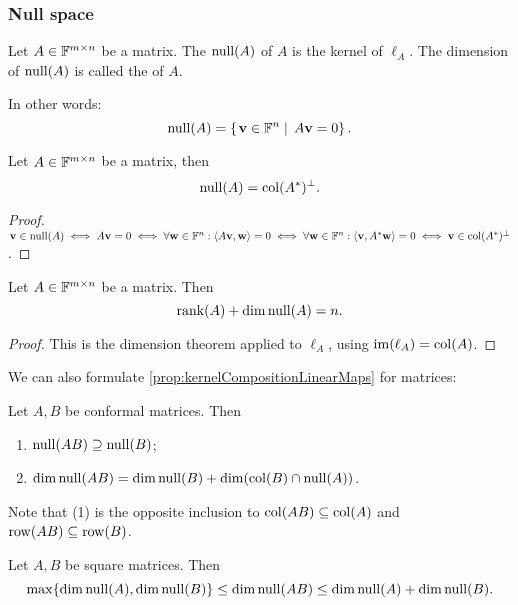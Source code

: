\subsubsection{Null space}
\begin{definition}
Let $A\in \mathbb{F}^{m\times n}$ be a matrix. The  $\operatorname{null}(A)$ of $A$ is the kernel of $\ell_A$. The dimension of $\operatorname{null}(A)$ is called the  of $A$.
\end{definition}
In other words:
\[ \operatorname{null}(A) = \left\{\left. \bm{\mathrm{v}}\in \mathbb{F}^n \;\right|\; A\bm{\mathrm{v}} = 0 \right\}. \]

\begin{proposition}
Let $A\in\mathbb{F}^{m\times n}$ be a matrix, then
\[ \operatorname{null}(A) = \operatorname{col}(A^*)^\perp. \]
\end{proposition}
\begin{proof}
$\bm{\mathrm{v}}\in\operatorname{null}(A) \iff A\bm{\mathrm{v}} = 0 \iff \forall \bm{\mathrm{w}}\in\mathbb{F}^n:\left\langle A\bm{\mathrm{v}},\bm{\mathrm{w}} \right\rangle=0 \iff \forall \bm{\mathrm{w}}\in\mathbb{F}^n: \left\langle \bm{\mathrm{v}},A^*\bm{\mathrm{w}} \right\rangle=0 \iff \bm{\mathrm{v}}\in\operatorname{col}(A^*)^\perp$.
\end{proof}

\begin{lemma} \label{lemma:dimensionTheoremMatrices}
Let $A\in \mathbb{F}^{m\times n}$ be a matrix. Then
\[ \operatorname{rank}(A) + \dim\operatorname{null}(A) = n. \]
\end{lemma}
\begin{proof}
This is the dimension theorem applied to $\ell_A$, using $\operatorname{im}(\ell_A) = \operatorname{col}(A)$.
\end{proof}

We can also formulate \ref{prop:kernelCompositionLinearMaps} for matrices:
\begin{proposition} \label{prop:nullSpaceProduct}
Let $A,B$ be conformal matrices. Then
\begin{enumerate}
\item $\operatorname{null}(AB)\supseteq \operatorname{null}(B)$;
\item $\dim\operatorname{null}(AB) = \dim\operatorname{null}(B) + \dim(\operatorname{col}(B)\cap\operatorname{null}(A))$.
\end{enumerate}
\end{proposition}
Note that (1) is the opposite inclusion to $\operatorname{col}(AB)\subseteq \operatorname{col}(A)$ and $\operatorname{row}(AB)\subseteq \operatorname{row}(B)$.
\begin{corollary}
Let $A,B$ be square matrices. Then
\[ \max\{\dim\operatorname{null}(A),\dim\operatorname{null}(B)\} \leq \dim\operatorname{null}(AB) \leq \dim\operatorname{null}(A) + \dim\operatorname{null}(B). \]
\end{corollary}



